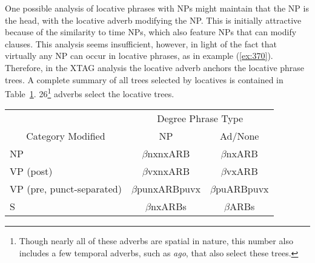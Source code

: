 One possible analysis of locative phrases with NPs might maintain that 
the NP is the head, with the locative adverb modifying the NP. This is 
initially attractive because of the similarity to time NPs, which also 
feature NPs that can modify clauses. This analysis seems insufficient, 
however, in light of the fact that virtually any NP can occur in 
locative phrases, as in example (\ref{ex:370}). Therefore, in the XTAG analysis 
the locative adverb anchors the locative phrase trees. A complete summary 
of all trees selected by locatives is contained in Table~\ref{loc-summary}. 
26\footnote{Though nearly all of these adverbs are spatial in nature, this number also includes a few temporal adverbs, such as {\it ago}, that also select these trees.} adverbs select the locative trees. 
 
\beginsentences
{}\label{ex:370} 
\endsentences

 
\begin{table}[htb] 
\centering 
\begin{tabular}{|l||c|c|} 
\hline 
\multicolumn{1}{|c||}{}& 
\multicolumn{2}{|c|}{Degree Phrase Type}\\ 
\cline{2-3} 
\multicolumn{1}{|c||}{Category Modified}&NP&Ad/None\\ 
\hline 
\hline 
NP&$\beta$nxnxARB&$\beta$nxARB\\ 
\hline 
VP (post)&$\beta$vxnxARB&$\beta$vxARB\\ 
\hline 
VP (pre, punct-separated)&$\beta$punxARBpuvx&$\beta$puARBpuvx\\ 
\hline 
S&$\beta$nxARBs&$\beta$ARBs\\ 
\hline 
\end{tabular} 
\begin{rawhtml} <dl> <dt>{Locative Modifiers <p> </dl> \end{rawhtml}
\label{loc-summary} 
\end{table} 
 
 
 
 
 
 
